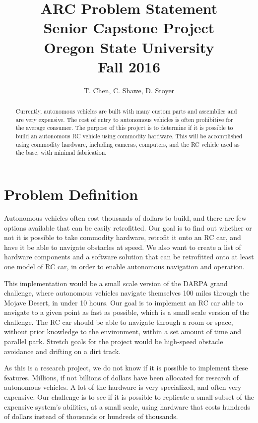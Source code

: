 \documentclass[draftclsnofoot,onecolumn,10pt]{IEEEtran}
\begin{document}
\begin{titlepage}
\title{
ARC Problem Statement\\
\LARGE
Senior Capstone Project\\
Oregon State University\\
Fall 2016
}

\author{T. Chen, C. Shawe, D. Stoyer}
\maketitle

\begin{abstract}
Currently, autonomous vehicles are built with many custom parts and assemblies
and are very expensive. The cost of entry to autonomous vehicles is often
prohibitive for the average consumer. The purpose of this project is to determine
if it is possible to build an autonomous RC vehicle using commodity hardware.
This will be accomplished using commodity hardware, including cameras, computers,
and the RC vehicle used as the base, with minimal fabrication.
\end{abstract}

\thispagestyle{empty} %

\end{titlepage}


\newpage

\section{Problem Definition}
Autonomous vehicles often cost thousands of dollars to build, and there are few
options available that can be easily retrofitted. Our goal is to find out whether
or not it is possible to take commodity hardware, retrofit it onto an RC car, and
have it be able to navigate obstacles at speed. We also want to create a list of
hardware components and a software solution that can be retrofitted onto at least
one model of RC car, in order to enable autonomous navigation and operation.\par
This implementation would be a small scale version of the DARPA grand challenge,
where autonomous vehicles navigate themselves 100 miles through the Mojave Desert,
in under 10 hours. Our goal is to implement an RC car able to navigate to a given
point as fast as possible, which is a small scale version of the challenge. The RC
car should be able to navigate through a room or space, without prior knowledge to
the environment, within a set amount of time and parallel park. Stretch goals for
the project would be high-speed obstacle avoidance and drifting on a dirt track.\par
As this is a research project, we do not know if it is possible to implement 
these features. Millions, if not billions of dollars have been allocated for
research of autonomous vehicles. A lot of the hardware is very specialized, and
often very expensive. Our challenge is to see if it is possible to replicate a small
subset of the expensive system's abilities, at a small scale, using hardware that costs 
hundreds of dollars instead of thousands or hundreds of thousands. 
\end{document}

